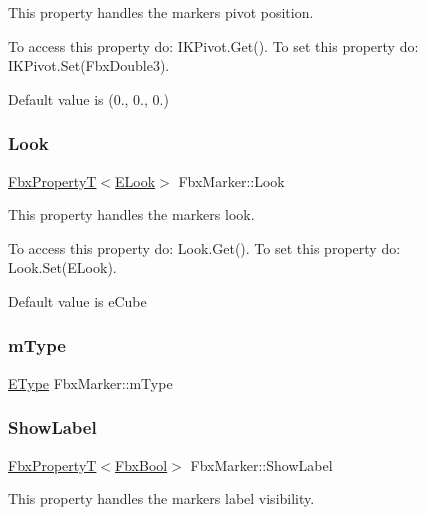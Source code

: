 This property handles the marker\textquotesingle{}s pivot position.

To access this property do\+: I\+K\+Pivot.\+Get(). To set this property do\+: I\+K\+Pivot.\+Set(\+Fbx\+Double3).

Default value is (0., 0., 0.) \mbox{\label{class_fbx_marker_a2d9dd3145381febcecd131cfce58cf65}} 
\subsubsection{\texorpdfstring{Look}{Look}}
{\footnotesize\ttfamily \hyperlink{class_fbx_property_t}{Fbx\+PropertyT}$<$\hyperlink{class_fbx_marker_a9e1fa9873c0d6da391d82d0de6a352c4}{E\+Look}$>$ Fbx\+Marker\+::\+Look}

This property handles the marker\textquotesingle{}s look.

To access this property do\+: Look.\+Get(). To set this property do\+: Look.\+Set(\+E\+Look).

Default value is e\+Cube \mbox{\label{class_fbx_marker_ad3808ca152160cea3a100715d2511ec0}} 
\subsubsection{\texorpdfstring{m\+Type}{mType}}
{\footnotesize\ttfamily \hyperlink{class_fbx_marker_ad1e38753dce9a2212df0364466d9f617}{E\+Type} Fbx\+Marker\+::m\+Type\hspace{0.3cm}{\ttfamily [protected]}}

\mbox{\label{class_fbx_marker_a69f9f3df5f70b603a2edf4393873ed14}} 
\subsubsection{\texorpdfstring{Show\+Label}{ShowLabel}}
{\footnotesize\ttfamily \hyperlink{class_fbx_property_t}{Fbx\+PropertyT}$<$\hyperlink{fbxtypes_8h_a92e0562b2fe33e76a242f498b362262e}{Fbx\+Bool}$>$ Fbx\+Marker\+::\+Show\+Label}

This property handles the marker\textquotesingle{}s label visibility.

